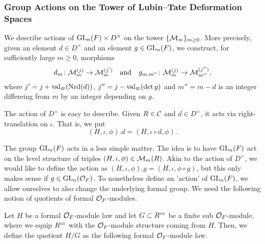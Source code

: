 \documentclass[../main.tex]{subfiles}
\begin{document}
\subsubsection{Group Actions on the Tower of Lubin--Tate Deformation Spaces} %
\label{ssub:Group Actions on the Tower of Lubin--Tate Deformation Spaces}
We describe actions of $\operatorname{GL}_n(F) \times D^\times$ on the tower
$\{\mathcal{M}_m\}_{m \geq 0}$. More precisely, given an element $d \in D^\times$ and an element
$g \in \operatorname{GL}_n(F)$, we construct, for sufficiently large $m\geq 0$, morphisms
\begin{equation*}
  d_m \colon \mathcal{M}_m^{(j)} \to \mathcal{M}_m^{(j')} \quad \text{and} \quad
  g_{m,m''} \colon \mathcal{M}_m^{(j)} \to \mathcal{M}_{m''}^{(j'')},
\end{equation*}
where $j'= j+\mathrm{val}_\varpi(\operatorname{Nrd}(d))$, $j'' = j - \mathrm{val}_\varpi(\det g)$ and $m''
= m-d$ is an integer differeing from $m$ by an integer depending on $g$. 

The action of $D^\times$ is easy to describe. Given $R \in \mathcal{C}$ and 
$d \in D^\times$, it acts via right-translation on $\iota$. That is, we put
\begin{equation*}
  (H, \iota, \phi).d = (H, \iota \circ d, \phi).
\end{equation*}

The group $\operatorname{GL}_n(F)$ acts in a less simple matter. The idea is to have
$\operatorname{GL}_n(F)$ act on the level structure of triples $(H, \iota, \phi) \in \mathcal{M}_m(R)$.
Akin to the action of $D^\times$, we would like to define the action as
$(H, \iota, \phi).g = (H, \iota, \phi \circ g)$, but this only makes sense
if $g \in \operatorname{GL}_n(\mathcal{O}_F)$. To nonetheless define an 'action' of $\operatorname{GL}_n(F)$, we
allow ourselves to also change the underlying formal group.
We need the following notion of quotients of formal $\mathcal{O}_F$-modules.

\begin{defi}\label{def:QuotientModule}
  Let $H$ be a formal $\mathcal{O}_F$-module law and let $G \subset R^{\circ \hspace{-0.5pt} \circ}$ be a finite
  sub $\mathcal{O}_F$-module, where we equip $R^{\circ \hspace{-0.5pt} \circ}$ with the $\mathcal{O}_F$-module structure 
  coming from $H$. Then, we define the quotient $H/G$ as the following formal
  $\mathcal{O}_F$-module law. 
\end{defi}
\end{document}
